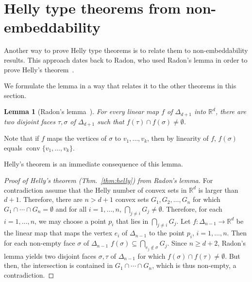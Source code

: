 \documentclass[a4paper,12pt]{amsart}
\newcommand{\R}{\mathbb{R}} 	%
\DeclareMathOperator{\conv}{conv}
\newtheorem{lemma}[theorem]{Lemma}
\theoremstyle{definition}
\begin{document}
\section{Helly type theorems from non-embeddability}\label{sec:embed}
Another way to prove Helly type theorems is to relate them to non-embeddability results. This approach dates back to Radon, who used Radon's lemma in order to prove Helly's theorem~\cite{Radon1921}.

We formulate the lemma in a way that relates it to the other theorems in this section. 

\begin{lemma}[Radon's lemma~\cite{Radon1921}]\label{lem:radon}
 For every linear map $f$ of $\Delta_{d+1}$ into $\R^d$, there are two disjoint faces $\tau,\sigma$ of $\Delta_{d+1}$ 
 such that $f(\tau)\cap f(\sigma)\neq \emptyset$.
\end{lemma}
Note that if $f$ maps the vertices of $\sigma$
to $v_1,\ldots, v_k$, then by linearity of $f$, $f(\sigma)$ equals $\conv\{v_1,\ldots, v_k\}$.

Helly's theorem is an immediate consequence of this lemma.
\begin{proof}[Proof of Helly's theorem (Thm.~\ref{thm:helly}) from Radon's lemma]
For contradiction assume that the Helly number of convex sets in $\R^d$ is larger than $d+1$. Therefore, there are $n>d+1$ convex sets $G_1,G_2,\ldots, G_n$ for which $G_1\cap\cdots\cap G_n=\emptyset$ and for all $i=1,\ldots, n$, $\bigcap_{j\neq i}G_j\neq\emptyset$. Therefore, for each $i=1,\ldots, n$, we may choose a point $p_i$ that lies in $\bigcap_{j\neq i}G_j$.
Let $f\colon \Delta_{n-1}\to \R^d$ be the linear map that maps the vertex $e_i$ of $\Delta_{n-1}$ to the point $p_i$, $i=1,\ldots, n$.
Then for each non-empty face $\sigma$ of $\Delta_{n-1}$
$f(\sigma)\subseteq \bigcap_{e_j\notin \sigma}G_j$.
Since $n\geq d+2$, Radon's lemma yields two disjoint faces $\sigma,\tau$ of $\Delta_{n-1}$ for which
$f(\sigma)\cap f(\tau)\neq\emptyset$.
But then, the intersection is contained in $G_1\cap \cdots\cap G_n$, which is thus non-empty, a contradiction.
\end{proof}
\end{document}
